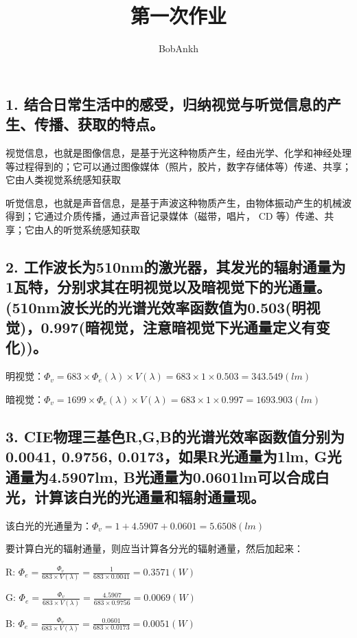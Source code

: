 \documentclass[]{article}
\title{第一次作业}
\author{BobAnkh}
\date{}
\begin{document}
\maketitle

\hypertarget{header-n1}{%
\subsection{1. 结合日常生活中的感受，归纳视觉与听觉信息的产生、传播、获取的特点。}\label{header-n1}}

视觉信息，也就是图像信息，是基于光这种物质产生，经由光学、化学和神经处理等过程得到的；它可以通过图像媒体（照片，胶片，数字存储体等）传递、共享；它由人类视觉系统感知获取

听觉信息，也就是声音信息，是基于声波这种物质产生，由物体振动产生的机械波得到；它通过介质传播，通过声音记录媒体（磁带，唱片，
CD 等）传递、共享；它由人的听觉系统感知获取

\hypertarget{header-n2}{%
\subsection{2. 工作波长为510nm的激光器，其发光的辐射通量为1瓦特，分别求其在明视觉以及暗视觉下的光通量。(510nm波长光的光谱光效率函数值为0.503(明视觉)，0.997(暗视觉，注意暗视觉下光通量定义有变化))。}\label{header-n2}}

明视觉：\(\Phi_v=683\times\Phi_e(\lambda)\times V(\lambda)=683\times 1\times 0.503=343.549(lm)\)

暗视觉：\(\Phi_v=1699\times\Phi_e(\lambda)\times V(\lambda)=683\times 1\times 0.997=1693.903(lm)\)

\hypertarget{header-n80}{%
\subsection{3. CIE物理三基色R,G,B的光谱光效率函数值分别为0.0041, 0.9756, 0.0173，如果R光通量为1lm, G光通量为4.5907lm, B光通量为0.0601lm可以合成白光，计算该白光的光通量和辐射通量现。}\label{header-n80}}

该白光的光通量为：\(\Phi_v=1+4.5907+0.0601=5.6508(lm)\)

要计算白光的辐射通量，则应当计算各分光的辐射通量，然后加起来：

R:
\(\Phi_e=\frac{\Phi_v}{683\times V(\lambda)}=\frac{1}{683\times 0.0041}=0.3571(W)\)

G:
\(\Phi_e=\frac{\Phi_v}{683\times V(\lambda)}=\frac{4.5907}{683\times 0.9756}=0.0069(W)\)

B:
\(\Phi_e=\frac{\Phi_v}{683\times V(\lambda)}=\frac{0.0601}{683\times 0.0173}=0.0051(W)\)
\end{document}
